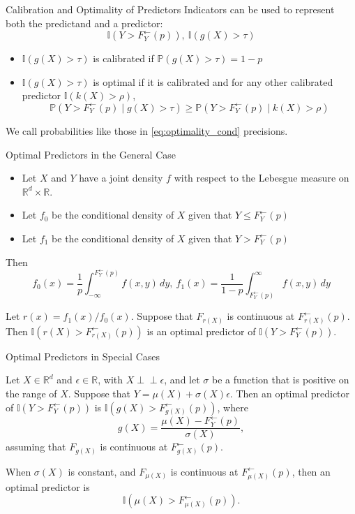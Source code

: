 \documentclass{beamer}
\def\I{\mathbb I}
\def\P{\mathbb P}
\def\R{\mathbb R}
\def\ind{\perp\!\!\!\perp}
\newcommand\Fi[1]{F_{#1}^{\leftarrow}}
\begin{document}
\begin{frame}{Calibration and Optimality of Predictors}
    Indicators can be used to represent both the predictand and a predictor:
    \[
    \I(Y > \Fi{Y}(p)), \ \I(g(X) > \tau)
    \]
    \begin{definition}
        \begin{itemize}
            \item $\I(g(X) > \tau)$ is calibrated if $\P(g(X) > \tau) = 1 - p$
            \item $\I(g(X) > \tau)$ is optimal if it is calibrated and for any other calibrated predictor $\I(k(X) > \rho)$,
            \begin{equation}\label{eq:optimality_cond}
                \P(Y > \Fi{Y}(p) \mid g(X) > \tau) \ge \P(Y > \Fi{Y}(p) \mid k(X) > \rho)
            \end{equation}
        \end{itemize}
    \end{definition}
    We call probabilities like those in \eqref{eq:optimality_cond} precisions.
\end{frame}

\begin{frame}{Optimal Predictors in the General Case}
    \begin{itemize}
        \item Let $X$ and $Y$ have a joint density $f$ with respect to the Lebesgue measure on $\R^d \times \mathbb{R}$.
        \item Let $f_0$ be the conditional density of $X$ given that $Y \le \Fi{Y}(p)$
        \item Let $f_1$ be the conditional density of $X$ given that $Y > \Fi{Y}(p)$
    \end{itemize}
    Then
    \[
    f_0(x) = \frac{1}{p}\int_{-\infty}^{\Fi{Y}(p)} f(x, y)\,dy, \
    f_1(x) = \frac{1}{1 - p}\int_{\Fi{Y}(p)}^{\infty} f(x, y)\,dy
    \]
    \begin{theorem}
        Let $r(x) = f_1(x) / f_0(x)$. Suppose that $F_{r(X)}$ is continuous at $\Fi{r(X)}(p)$. Then $\I(r(X) > \Fi{r(X)}(p))$ is an optimal predictor of $\I(Y > \Fi{Y}(p))$.
    \end{theorem}
\end{frame}

\begin{frame}{Optimal Predictors in Special Cases}
    \begin{theorem}
        Let $X \in \R^d$ and $\epsilon \in \R$, with $X \ind \epsilon$, and let $\sigma$ be a function that is positive on the range of $X$. Suppose that $Y = \mu(X) + \sigma(X)\epsilon$. Then an optimal predictor of $\I(Y > \Fi{Y}(p))$ is $\I(g(X) > \Fi{g(X)}(p))$, where
        \[
        g(X) = \frac{\mu(X) - \Fi{Y}(p)}{\sigma(X)},
        \]
        assuming that $F_{g(X)}$ is continuous at $\Fi{g(X)}(p)$.
    \end{theorem}
    \begin{corollary}
        When $\sigma(X)$ is constant, and $F_{\mu(X)}$ is continuous at $\Fi{\mu(X)}(p)$, then an optimal predictor is
        \[
        \I(\mu(X) > \Fi{\mu(X)}(p)).
        \]
    \end{corollary}
\end{frame}
\end{document}
